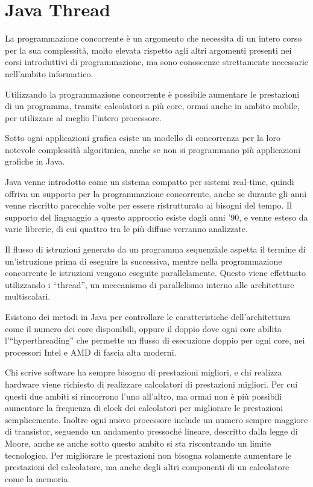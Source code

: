 \documentclass{article}
\numberwithin{equation}{subsection}
\begin{document}
\clearpage

\section{Java Thread}

La programmazione concorrente è un argomento che necessita di un intero corso per la sua complessità, molto elevata rispetto agli altri argomenti presenti nei corsi 
introduttivi di programmazione, ma sono conoscenze strettamente necessarie nell'ambito informatico. 

Utilizzando la programmazione concorrente è possibile aumentare le prestazioni di un programma, tramite calcolatori a più core, ormai anche in ambito mobile, per utilizzare al 
meglio l'intero processore. 

Sotto ogni applicazioni grafica esiste un modello di concorrenza per la loro notevole complessità algoritmica, anche se non si programmano più applicazioni 
grafiche in Java. 

Java venne introdotto come un sistema compatto per sistemi real-time, quindi offriva un supporto per la programmazione concorrente, anche se durante gli anni venne 
riscritto parecchie volte per essere ristrutturato ai bisogni del tempo. 
Il supporto del linguaggio a questo approccio esiste dagli anni '90, e venne esteso da varie librerie, di cui quattro tra le più diffuse verranno analizzate. 

Il flusso di istruzioni generato da un programma sequenziale aspetta il termine di un'istruzione prima di eseguire la successiva, mentre nella programmazione 
concorrente le istruzioni vengono eseguite parallelamente.  
Questo viene effettuato utilizzando i ``thread'', un meccanismo di parallelismo interno alle architetture multiscalari. 

Esistono dei metodi in Java per controllare le caratteristiche dell'architettura come il numero dei core disponibili, oppure il doppio dove ogni core abilita l'``hyperthreading'' 
che permette un flusso di esecuzione doppio per ogni core, nei processori Intel e AMD di fascia alta moderni. 

Chi scrive software ha sempre bisogno di prestazioni migliori, e chi realizza hardware viene richiesto di realizzare calcolatori di prestazioni migliori. Per cui 
questi due ambiti si rincorrono l'uno all'altro, ma ormai non è più possibili aumentare la frequenza di clock dei calcolatori per migliorare le prestazioni semplicemente. 
Inoltre ogni nuovo processore include un numero sempre maggiore di transistor, seguendo un andamento pressoché lineare, descritto dalla legge di Moore, anche se anche sotto 
questo ambito si sta riscontrando un limite tecnologico. Per migliorare le prestazioni non bisogna solamente aumentare le prestazioni del calcolatore, ma anche degli altri 
componenti di un calcolatore come la memoria. 
\end{document}
